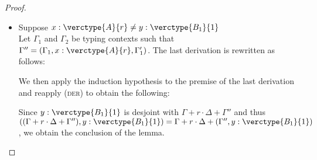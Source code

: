 \begin{proof}
\begin{itemize}
\begin{itemize}
\item Suppose $x:\verctype{A}{r} \neq y:\verctype{B_1}{1}$\\
Let $\Gamma_1$ and $\Gamma_2$ be typing contexts such that $\Gamma'' = (\Gamma_1, x:\verctype{A}{r}, \Gamma_1')$.
The last derivation is rewritten as follows:
\begin{center}
    \begin{minipage}{.60\linewidth}
    \end{minipage}
\end{center}
We then apply the induction hypothesis to the premise of the last derivation and reapply (\textsc{der}) to obtain the following:
\begin{center}
    \begin{minipage}{.70\linewidth}
    \end{minipage}
\end{center}
Since $y:\verctype{B_1}{1}$ is desjoint with $\Gamma+r\cdot\Delta+\Gamma''$ and thus $((\Gamma + r\cdot\Delta + \Gamma''), y:\verctype{B_1}{1}) = \Gamma + r\cdot\Delta + (\Gamma'', y:\verctype{B_1}{1})$, we obtain the conclusion of the lemma.\\
\end{itemize}



\end{itemize}
\end{proof}
